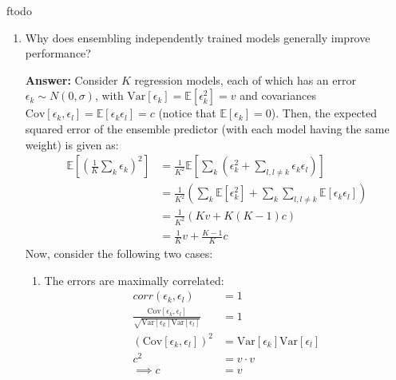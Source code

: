 ƒtodo\documentclass{article}
\newenvironment{QandA}{\begin{enumerate}[label=\arabic*.]}{\end{enumerate}}
\newenvironment{InnerQandA}{\begin{enumerate}[label=\roman*.]}{\end{enumerate}}
\newenvironment{ListAlph}{\begin{enumerate}[label=(\alph*)]}{\end{enumerate}}
\newenvironment{answer}{\par\normalfont \textbf{Answer:}}{}
\newcommand{\Exp}[1]{\mathbb{E}\left[ #1 \right]}
\newcommand{\Vari}[1]{\text{Var}\left[ #1 \right]}
\newcommand{\Cov}[1]{\text{Cov}\left[ #1 \right]}
\begin{document}
\begin{QandA}
\begin{InnerQandA}
\begin{answer}
\begin{ListAlph}
                \item \textit{Inference time requirements}: Since parametric models use a fixed parametrization, they are more applicable in cases when we need consistent inference time guarantees. In contrast, the prediction time of non-parametric methods might depend on the dataset size (e.g. finding k-nearest neighbors, iterating over all support vectors, \ldots)
            \end{ListAlph}
            
        \end{answer}
    \end{InnerQandA}
    
    \item Why does ensembling independently trained models generally improve performance?
    \begin{answer}
        Consider $K$ regression models, each of which has an error $\epsilon_k \sim N(0, \sigma)$, with $\Vari{\epsilon_k} = \Exp{\epsilon_k^2} = v$ and covariances $\Cov{\epsilon_k, \epsilon_l} = \Exp{\epsilon_k \epsilon_l} = c$ (notice that $\Exp{\epsilon_k}=0$). Then, the expected squared error of the ensemble predictor (with each model having the same weight) is given as:
        \begin{align*}
            \Exp{\left( \frac{1}{K} \sum_{k} \epsilon_k \right)^2} &= \frac{1}{K^2} \Exp{ \sum_k \left(\epsilon_k^2 + \sum_{l, l \neq k} \epsilon_k \epsilon_l \right)} \\
            &= \frac{1}{K^2} \left( \sum_{k} \Exp{\epsilon_k^2} + \sum_k \sum_{l, l \neq k} \Exp{\epsilon_k \epsilon_l} \right) \\
            &= \frac{1}{K^2} \left( Kv + K(K-1)c \right) \\
            &= \frac{1}{K}v + \frac{K-1}{K}c
        \end{align*}
        Now, consider the following two cases:
        \begin{ListAlph}
            \item The errors are maximally correlated:
            \begin{align*}
                corr(\epsilon_k, \epsilon_l) &= 1 \\
                \frac{\Cov{\epsilon_k, \epsilon_l}}{\sqrt{\Vari{\epsilon_k} \Vari{\epsilon_l}}} &= 1 \\
                (\Cov{\epsilon_k, \epsilon_l})^2 &= \Vari{\epsilon_k} \Vari{\epsilon_l} \\
                c^2 &= v \cdot v \\
                \implies c &= v
            \end{align*}


\end{ListAlph}
\end{answer}
\end{QandA}
\end{document}
